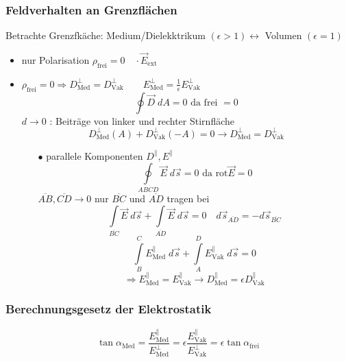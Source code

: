 \documentclass[titlepage,12pt,a4paper,ngerman]{report}
\newcommand{\tx}[1]{\textrm{#1}}
\newcommand{\ol}[1]{\overline{#1}}
\begin{document}
\subsubsection{Feldverhalten an Grenzflächen}
Betrachte Grenzfkäche: Medium/Dielekktrikum $(\epsilon>1) \leftrightarrow$ Volumen $(\epsilon=1)$
\begin{itemize}
\item nur Polarisation $\rho_{\tx{frei}} = 0 \quad \cdot \vec{E}_{\tx{ext}}$
\item $\rho_{\tx{frei}} = 0 \Rightarrow D ^\perp _\tx{Med} = D ^\perp _\tx{Vak} \qquad E_{\tx{Med}}^{\perp} = \frac{1}{\epsilon} E^{\perp}_{\tx{Vak}}$
$$\oint\vec{D}\; dA = 0 \tx{ da frei } = 0$$
$d\rightarrow0$ : Beiträge von linker und rechter Stirnfläche
$$D^{\perp}_{\tx{Med}} (A) + D^{\perp}_{\tx{Vak}}(-A) = 0 \rightarrow D^{\perp}_{\tx{Med}} = D^{\perp}_{\tx{Vak}}$$
\begin{itemize}
\item[$\bullet$] parallele Komponenten $D^{\parallel} , E^{\parallel}$
$$\oint\limits_{ABCD} \vec{E}\;d\vec{s} = 0 \tx{ da rot}\vec{E} = 0$$
$\ol{AB}, \ol{CD} \rightarrow 0$ nur $\ol{BC}$ und $\ol{AD}$ tragen bei
$$\int\limits_{\ol{BC}}\vec{E}\;d\vec{s} + \int\limits_{\ol{AD}} \vec{E} \;d\vec{s} = 0 \quad d\vec{s}_{\ol{AD}} = -d\vec{s}_{\ol{BC}}$$
$$\int\limits_B^C E^{\parallel}_{\tx{Med}} \;d\vec{s} + \int\limits_A^D E^{\parallel}_{\tx{Vak}}  \;d\vec{s} = 0$$
$$\Rightarrow  E^{\parallel}_{\tx{Med}} = E^{\parallel}_{\tx{Vak}}  \rightarrow D^{\parallel}_{\tx{Med}} = \epsilon D^{\parallel}_{\tx{Vak}}$$
\end{itemize}
\end{itemize}

\subsubsection{Berechnungsgesetz der Elektrostatik}
$$\tan \alpha_{\tx{Med}} = \frac{E^{\parallel}_{\tx{Med}}}{E^{\perp}_{\tx{Med}}} = \epsilon \frac{E^{\parallel}_{\tx{Vak}}}{E^{\perp}_{\tx{Vak}}} = \epsilon \tan \alpha_{\tx{frei}}$$
\end{document}

